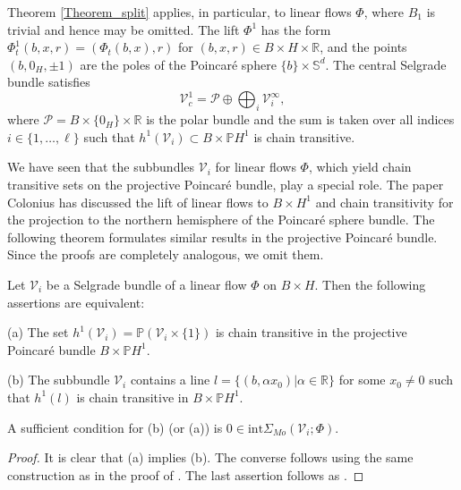 	\begin{remark}
		\label{Remark_linear2}Theorem \ref{Theorem_split} applies, in particular, to
		linear flows $\Phi$, where $B_{1}$ is trivial and hence may be omitted. The
		lift $\Phi^{1}$ has the form $\Phi_{t}^{1}(b,x,r)=\left(  \Phi_{t}%
		(b,x),r\right)  $ for $(b,x,r)\in B\times H\times\mathbb{R}$, and the points
		$(b,0_{H},\pm1)$ are the poles of the Poincar\'{e} sphere $\{b\}\times
		\mathbb{S}^{d}$. The central Selgrade bundle satisfies
		\[
		\mathcal{V}_{c}^{1}=\mathcal{P}\oplus\bigoplus\nolimits_{i}\mathcal{V}%
		_{i}^{\infty},
		\]
		where $\mathcal{P}=B\times\{0_{H}\}\times\mathbb{R}$ is the polar bundle and the
		sum is taken over all indices $i\in\{1,\ldots,\ell\}$ such that $h^{1}%
		(\mathcal{V}_{i})\subset B\times\mathbb{P}H^{1}$ is chain transitive.
	\end{remark}
	
	We have seen that the subbundles $\mathcal{V}_{i}$ for linear flows $\Phi$,
	which yield chain transitive sets on the projective Poincar\'{e} bundle, play
	a special role. The paper Colonius \cite{Col23} has discussed the lift of
	linear flows to $B\times H^{1}$ and chain transitivity for the projection to
	the northern hemisphere of the Poincar\'{e} sphere bundle. The following
	theorem formulates similar results in the projective Poincar\'{e} bundle.
	Since the proofs are completely analogous, we omit them.
	
	\begin{theorem}
		\label{Corollary4.4}Let $\mathcal{V}_{i}$ be a Selgrade bundle of a linear
		flow $\Phi$ on $B\times H$. Then the following assertions are equivalent:
		
		(a) The set $h^{1}(\mathcal{V}_{i})=\mathbb{P}(\mathcal{V}_{i}\times\{1\})$ is
		chain transitive in the projective Poincar\'{e} bundle $B\times\mathbb{P}
		H^{1}$.
		
		(b) The subbundle $\mathcal{V}_{i}$ contains a line $l=\{(b,\alpha
		x_{0})\left\vert \alpha\in\mathbb{R}\right.  \}$ for some $x_{0}\not =0$ such
		that $h^{1}(l)$ is chain transitive in $B\times\mathbb{P}H^{1}$.
		
		A sufficient condition for (b) (or (a)) is $0\in\mathrm{int}\Sigma
		_{Mo}(\mathcal{V}_{i};\Phi)$.
	\end{theorem}
	
	\begin{proof}
		It is clear that (a) implies (b). The converse follows using the same
		construction as in the proof of \cite[Theorem 4.3]{Col23}. The last assertion
		follows as \cite[Theorem 4.7]{Col23}.
	\end{proof}
	
